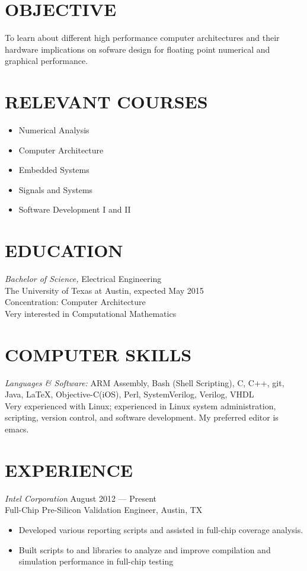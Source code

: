 \documentclass[margin]{res}
\begin{document}
\begin{resume}
  \section{OBJECTIVE} 
  To learn about different high performance computer architectures and
  their hardware implications on sofware design for floating point
  numerical and graphical performance.
  \section{RELEVANT COURSES}
  \begin{multicols}{2}
    \begin{itemize}
    \item Numerical Analysis
    \item Computer Architecture
    \item Embedded Systems
    \item Signals and Systems
    \item Software Development I and II
    \end{itemize}
  \end{multicols}
  \section{EDUCATION} 
  {\sl Bachelor of Science,} Electrical Engineering \\
  The University of Texas at Austin,
  expected May 2015 \\
  Concentration: Computer Architecture \\
  Very interested in Computational Mathematics

  \section{COMPUTER SKILLS} 
  {\sl Languages \& Software:} 
  ARM Assembly, Bash (Shell Scripting), C, C++, git, Java, \LaTeX,
  \mbox{Objective-C(iOS)}, Perl, SystemVerilog, Verilog, VHDL 
  \vspace{1.0em}\\
  Very experienced with Linux; experienced in Linux system
  administration, scripting, version control, and software
  development. My preferred editor is emacs.

  \section{EXPERIENCE} {\sl Intel Corporation} 
  \hfill August 2012 --- Present \\
  Full-Chip Pre-Silicon Validation Engineer, Austin, TX
  \begin{itemize}
  \item Developed various reporting scripts and assisted in full-chip
    coverage analysis.
  \item Built scripts to and libraries to analyze and improve
    compilation and simulation performance in full-chip testing
  \end{itemize}


\end{resume}
\end{document}
